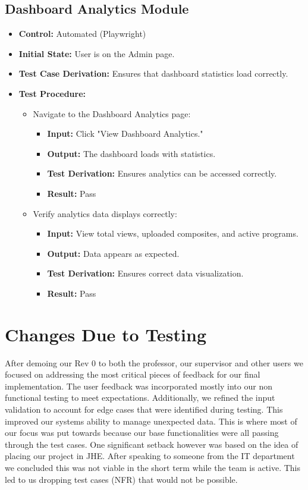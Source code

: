 \documentclass[12pt, titlepage]{article}
\begin{document}
\subsection{Dashboard Analytics Module}
\begin{itemize}
    \item \textbf{Control: }Automated (Playwright)
    \item \textbf{Initial State: }User is on the Admin page.
    \item \textbf{Test Case Derivation: }Ensures that dashboard statistics load correctly.
    \item \textbf{Test Procedure: }
    \begin{itemize}
        \item Navigate to the Dashboard Analytics page:
        \begin{itemize}
            \item \textbf{Input: }Click "View Dashboard Analytics."
            \item \textbf{Output: }The dashboard loads with statistics.
            \item \textbf{Test Derivation: }Ensures analytics can be accessed correctly.
            \item \textbf{Result: }Pass
        \end{itemize}
        \item Verify analytics data displays correctly:
        \begin{itemize}
            \item \textbf{Input: }View total views, uploaded composites, and active programs.
            \item \textbf{Output: }Data appears as expected.
            \item \textbf{Test Derivation: }Ensures correct data visualization.
            \item \textbf{Result: }Pass
        \end{itemize}
    \end{itemize}
\end{itemize}

\section{Changes Due to Testing}

After demoing our Rev 0 to both the professor, our supervisor and other users we focused on addressing the most critical pieces of feedback for our final implementation. The user feedback was incorporated mostly into our non functional testing to meet expectations. Additionally, we refined the input validation to account for edge cases that were identified during testing. This improved our systems ability to manage unexpected data. This is where most of our focus was put towards because our base functionalities were all passing through the test cases. One significant setback however was based on the idea of placing our project in JHE. After speaking to someone from the IT department we concluded this was not viable in the short term while the team is active. This led to us dropping test cases (NFR) that would not be possible.
\end{document}
